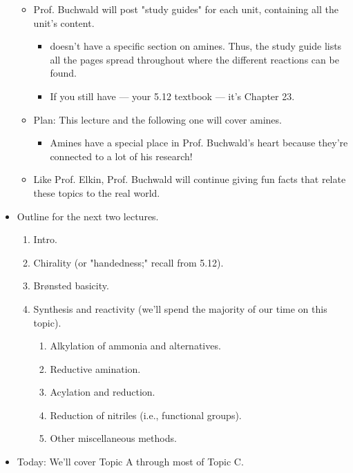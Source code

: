 \documentclass[../notes.tex]{subfiles}
\begin{document}
\begin{itemize}
\begin{itemize}
\begin{itemize}
        \end{itemize}
        \item Prof. Buchwald will post "study guides" for each unit, containing all the unit's content.
        \begin{itemize}
            \item \textcite{bib:Clayden} doesn't have a specific section on amines. Thus, the study guide lists all the pages spread throughout \textcite{bib:Clayden} where the different reactions can be found.
            \item If you still have \textcite{bib:Smith} --- your 5.12 textbook --- it's Chapter 23.
        \end{itemize}
        \item Plan: This lecture and the following one will cover amines.
        \begin{itemize}
            \item Amines have a special place in Prof. Buchwald's heart because they're connected to a lot of his research!
        \end{itemize}
        \item Like Prof. Elkin, Prof. Buchwald will continue giving fun facts that relate these topics to the real world.
    \end{itemize}
    \item Outline for the next two lectures.
    \begin{enumerate}[label={\Alph*.}]
        \item Intro.
        \item Chirality (or "handedness;" recall from 5.12).
        \item Br\o nsted basicity.
        \item Synthesis and reactivity (we'll spend the majority of our time on this topic).
        \begin{enumerate}[label={\arabic*.}]
            \item Alkylation of ammonia and alternatives.
            \item Reductive amination.
            \item Acylation and reduction.
            \item Reduction of nitriles (i.e.,  functional groups).
            \item Other miscellaneous methods.
        \end{enumerate}
    \end{enumerate}
    \item Today: We'll cover Topic A through most of Topic C.

\end{itemize}
\end{document}
